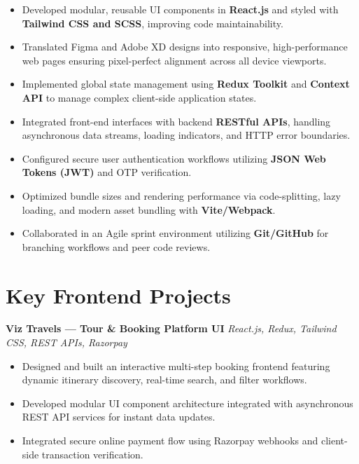\documentclass[a4paper,10pt]{article}
\begin{document}
\begin{itemize}

    \item Developed modular, reusable UI components in \textbf{React.js} and styled with \textbf{Tailwind CSS and SCSS}, improving code maintainability.

    \item Translated Figma and Adobe XD designs into responsive, high-performance web pages ensuring pixel-perfect alignment across all device viewports.

    \item Implemented global state management using \textbf{Redux Toolkit} and \textbf{Context API} to manage complex client-side application states.

    \item Integrated front-end interfaces with backend \textbf{RESTful APIs}, handling asynchronous data streams, loading indicators, and HTTP error boundaries.

    \item Configured secure user authentication workflows utilizing \textbf{JSON Web Tokens (JWT)} and OTP verification.

    \item Optimized bundle sizes and rendering performance via code-splitting, lazy loading, and modern asset bundling with \textbf{Vite/Webpack}.

    \item Collaborated in an Agile sprint environment utilizing \textbf{Git/GitHub} for branching workflows and peer code reviews.

\end{itemize}

\section*{Key Frontend Projects}

\textbf{Viz Travels --- Tour \& Booking Platform UI}
\hfill
\textit{React.js, Redux, Tailwind CSS, REST APIs, Razorpay}

\begin{itemize}

    \item Designed and built an interactive multi-step booking frontend featuring dynamic itinerary discovery, real-time search, and filter workflows.

    \item Developed modular UI component architecture integrated with asynchronous REST API services for instant data updates.

    \item Integrated secure online payment flow using Razorpay webhooks and client-side transaction verification.

\end{itemize}
\end{document}
